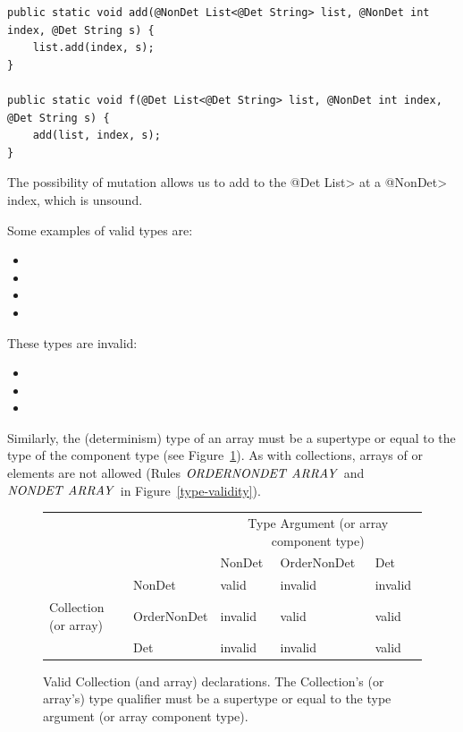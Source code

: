 \begin{verbatim}
public static void add(@NonDet List<@Det String> list, @NonDet int index, @Det String s) {
    list.add(index, s);
}

public static void f(@Det List<@Det String> list, @NonDet int index, @Det String s) {
    add(list, index, s);
}
\end{verbatim}

The possibility of mutation allows us to add to the \<@Det List> at a
\<@NonDet> index, which is unsound.


Some examples of valid types are:
\begin{itemize}
    \item {}
    \item {}
    \item {}
    \item {}
\end{itemize}

These types are invalid:
\begin{itemize}
    \item {}
    \item {}
    \item {}
\end{itemize}

Similarly, the (determinism) type of an array must be a supertype or equal to
the type of the component type (see Figure~\ref{fig-determinism-collections}).
As with collections,  arrays of  or 
elements are not allowed (Rules $\sc{\mathit{ORDERNONDET \ ARRAY}}$ and $\sc{\mathit{NONDET \ ARRAY}}$ in Figure~\ref{type-validity}).

\begin{figure}
    \centering
    \begin{tabular}{|l|l|l|l|l|}
        \cline{3-5}
        \multicolumn{2}{c|}{~}  &  \multicolumn{3}{c|}{Type Argument (or array component type)} \\ \cline{3-5}
        \multicolumn{2}{c|}{~}  & NonDet     & OrderNonDet & Det \\ \hline
        & NonDet      &   valid    &  invalid    & invalid  \\ \cline{2-5}
        Collection (or array)   & OrderNonDet &   invalid  &  valid      & valid  \\ \cline{2-5}
        & Det         &   invalid  &  invalid    & valid      \\ \hline
    \end{tabular}
    \caption{Valid Collection (and array) declarations.  The Collection's (or array's) type qualifier
        must be a supertype or equal to the type argument (or array component type).}
    \label{fig-determinism-collections}
\end{figure}


